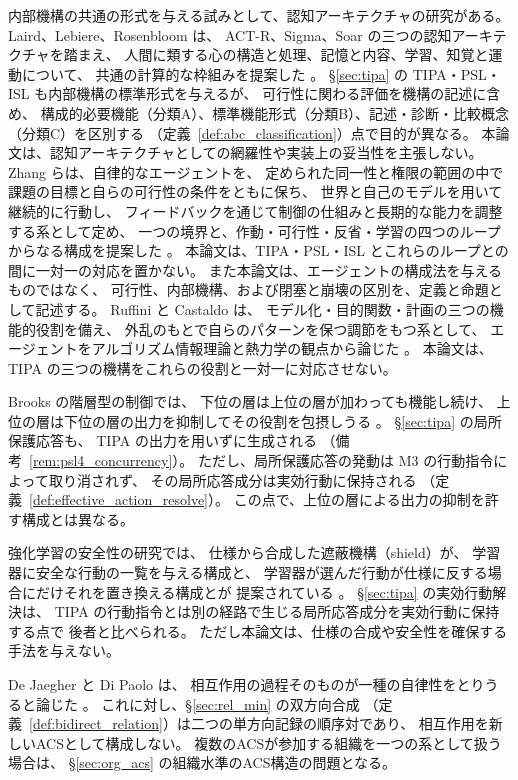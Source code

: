 内部機構の共通の形式を与える試みとして、認知アーキテクチャの研究がある。
Laird、Lebiere、Rosenbloom は、
ACT-R、Sigma、Soar の三つの認知アーキテクチャを踏まえ、
人間に類する心の構造と処理、記憶と内容、学習、知覚と運動について、
共通の計算的な枠組みを提案した
\cite{LairdLebiereRosenbloom2017}。
\S\ref{sec:tipa} の TIPA・PSL・ISL も内部機構の標準形式を与えるが、
可行性に関わる評価を機構の記述に含め、
構成的必要機能（分類A）、標準機能形式（分類B）、記述・診断・比較概念（分類C）を区別する
（定義~\ref{def:abc_classification}）点で目的が異なる。
本論文は、認知アーキテクチャとしての網羅性や実装上の妥当性を主張しない。
Zhang らは、自律的なエージェントを、
定められた同一性と権限の範囲の中で課題の目標と自らの可行性の条件をともに保ち、
世界と自己のモデルを用いて継続的に行動し、
フィードバックを通じて制御の仕組みと長期的な能力を調整する系として定め、
一つの境界と、作動・可行性・反省・学習の四つのループからなる構成を提案した
\cite{ZhangEtAl2026}。
本論文は、TIPA・PSL・ISL とこれらのループとの間に一対一の対応を置かない。
また本論文は、エージェントの構成法を与えるものではなく、
可行性、内部機構、および閉塞と崩壊の区別を、定義と命題として記述する。
Ruffini と Castaldo は、
モデル化・目的関数・計画の三つの機能的役割を備え、
外乱のもとで自らのパターンを保つ調節をもつ系として、
エージェントをアルゴリズム情報理論と熱力学の観点から論じた
\cite{RuffiniCastaldo2026}。
本論文は、TIPA の三つの機構をこれらの役割と一対一に対応させない。

Brooks の階層型の制御では、
下位の層は上位の層が加わっても機能し続け、
上位の層は下位の層の出力を抑制してその役割を包摂しうる
\cite{Brooks1986}。
\S\ref{sec:tipa} の局所保護応答も、
TIPA の出力を用いずに生成される
（備考~\ref{rem:psl4_concurrency}）。
ただし、局所保護応答の発動は M3 の行動指令によって取り消されず、
その局所応答成分は実効行動に保持される
（定義~\ref{def:effective_action_resolve}）。
この点で、上位の層による出力の抑制を許す構成とは異なる。

強化学習の安全性の研究では、
仕様から合成した遮蔽機構（shield）が、
学習器に安全な行動の一覧を与える構成と、
学習器が選んだ行動が仕様に反する場合にだけそれを置き換える構成とが
提案されている \cite{AlshiekhEtAl2018}。
\S\ref{sec:tipa} の実効行動解決は、
TIPA の行動指令とは別の経路で生じる局所応答成分を実効行動に保持する点で
後者と比べられる。
ただし本論文は、仕様の合成や安全性を確保する手法を与えない。

De Jaegher と Di Paolo は、
相互作用の過程そのものが一種の自律性をとりうると論じた
\cite{DeJaegherDiPaolo2007}。
これに対し、\S\ref{sec:rel_min} の双方向合成
（定義~\ref{def:bidirect_relation}）は二つの単方向記録の順序対であり、
相互作用を新しいACSとして構成しない。
複数のACSが参加する組織を一つの系として扱う場合は、
\S\ref{sec:org_acs} の組織水準のACS構造の問題となる。

